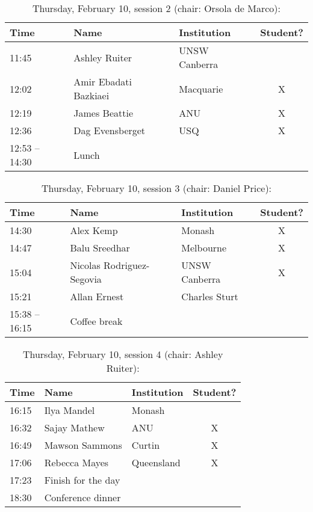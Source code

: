 \documentclass[amsmath,onecolumn]{revtex4-1}
\begin{document}
\begin{table}[!htbp]
	\centering
	\caption{Thursday, February 10, session 2 (chair: Orsola de Marco):}
\begin{tabular}{| l | l | l | c |}
	\hline
	Time & Name  & Institution & Student? \\ 		
	\hline
	11:45 &{Ashley Ruiter} & UNSW Canberra &  \\
	12:02 & {Amir Ebadati Bazkiaei} & Macquarie &  X \\
	12:19 & {James Beattie} & ANU & X \\
	12:36 &  {Dag Evensberget} & USQ & X\\
	12:53 -- 14:30 & Lunch & & \\
	\hline
\end{tabular}
\end{table}	


\begin{table}[!htbp]
	\centering
	\caption{Thursday, February 10, session 3 (chair: Daniel Price):}
\begin{tabular}{| l | l | l | c |}
	\hline
	Time & Name  & Institution & Student? \\ 		
	\hline
	14:30 & {Alex Kemp} & Monash & X  \\
	14:47 & {Balu Sreedhar} & Melbourne & X \\
	15:04 & {Nicolas Rodriguez-Segovia} & UNSW Canberra & X\\
	15:21 & {Allan Ernest} &  Charles Sturt&  \\
	15:38 -- 16:15 & Coffee break & & \\
	\hline
\end{tabular}
\end{table}

\begin{table}[!htbp]
	\centering
	\caption{Thursday, February 10, session 4 (chair: Ashley Ruiter):}
\begin{tabular}{| l | l | l | c |}
	\hline
	Time & Name  & Institution & Student? \\ 		
	\hline
	16:15 & {Ilya Mandel} & Monash &  \\
	16:32 & {Sajay Mathew} & ANU & X \\
	16:49 & {Mawson Sammons} & Curtin & X \\
	17:06 & {Rebecca Mayes} & Queensland & X \\
	17:23 & Finish for the day & & \\
	18:30 & Conference dinner & & \\
	\hline
\end{tabular}
\end{table}
\end{document}
